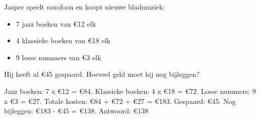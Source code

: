 \begin{opgave}
Jasper speelt saxofoon en koopt nieuwe bladmuziek:

\begin{itemize}
\item 7 jazz boeken van €12 elk
\item 4 klassieke boeken van €18 elk  
\item 9 losse nummers van €3 elk
\end{itemize}

Hij heeft al €45 gespaard. Hoeveel geld moet hij nog bijleggen?
\end{opgave}

\begin{oplossing}
Jazz boeken: 7 x €12 = €84.
Klassieke boeken: 4 x €18 = €72.
Losse nummers: 9 x €3 = €27.
Totale kosten: €84 + €72 + €27 = €183.
Gespaard: €45.
Nog bijleggen: €183 - €45 = €138.
Antwoord: €138
\end{oplossing}